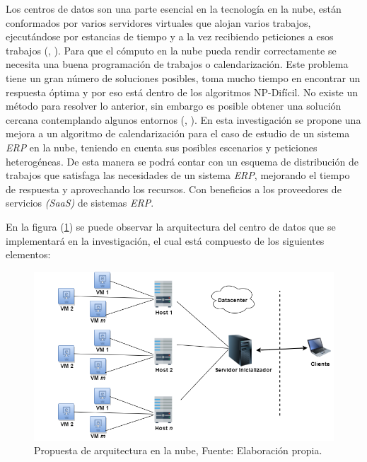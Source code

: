 Los centros de datos son una parte esencial en la tecnolog\'ia en la nube, est\'an conformados por varios servidores virtuales que alojan varios trabajos, ejecut\'andose por estancias de tiempo y a la vez recibiendo peticiones a esos trabajos (\citeauthor{shimpy2014different}, \citeyear{shimpy2014different}).
Para que el c\'omputo en la nube pueda rendir correctamente se necesita una buena programaci\'on de trabajos o calendarizaci\'on. Este problema tiene un gran n\'umero de soluciones posibles, toma mucho tiempo en encontrar un respuesta \'optima y por eso est\'a dentro de los algoritmos NP-Dif\'icil. No existe un m\'etodo para resolver lo anterior, sin embargo es posible obtener una soluci\'on cercana contemplando algunos entornos (\citeauthor{shimpy2014different}, \citeyear{shimpy2014different}).
En esta investigaci\'on se propone una mejora a un algoritmo de calendarizaci\'on para el caso de estudio de un sistema \textit{ERP} en la nube, teniendo en cuenta sus posibles escenarios y peticiones heterog\'eneas. De esta manera se podr\'a contar con un esquema de distribuci\'on de trabajos que satisfaga las necesidades de un sistema \textit{ERP}, mejorando el tiempo de respuesta y aprovechando los recursos. Con beneficios a los proveedores de servicios \textit{(SaaS)} de sistemas \textit{ERP}.


En la figura (\ref{fig:uno}) se puede observar la arquitectura del centro de datos que se implementar\'a en la investigaci\'on, el cual est\'a compuesto de los siguientes elementos:

\newpage

\setcounter{figure}{0}
\renewcommand\thefigure{\arabic{figure}}
\begin{figure}[h!]
	
	\centering
	\includegraphics[scale=0.5]{media/cloud2}
	\caption{Propuesta de arquitectura en la nube, Fuente: Elaboraci\'on propia.}
	\label{fig:uno}
\end{figure}




